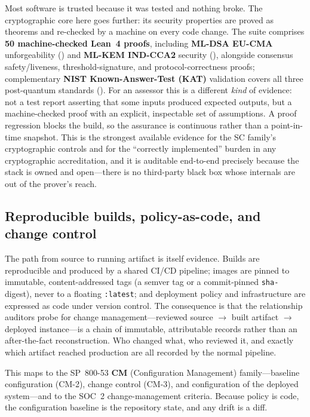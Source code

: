 \documentclass[11pt,letterpaper]{article}
\begin{document}
Most software is trusted because it was tested and nothing broke. The cryptographic
core here goes further: its security properties are proved as theorems and re-checked
by a machine on every code change. The suite comprises \textbf{50 machine-checked
Lean~4 proofs}, including \textbf{ML-DSA EU-CMA} unforgeability () and
\textbf{ML-KEM IND-CCA2} security (), alongside consensus safety/liveness,
threshold-signature, and protocol-correctness proofs; complementary
\textbf{NIST Known-Answer-Test (KAT)} validation covers all three post-quantum
standards (). For an assessor this is a different \emph{kind} of
evidence: not a test report asserting that some inputs produced expected outputs, but
a machine-checked proof with an explicit, inspectable set of assumptions. A proof
regression blocks the build, so the assurance is continuous rather than a point-in-time
snapshot. This is the strongest available evidence for the SC family's cryptographic
controls and for the ``correctly implemented'' burden in any cryptographic
accreditation, and it is auditable end-to-end precisely because the stack is owned and
open---there is no third-party black box whose internals are out of the prover's reach.

\subsection{Reproducible builds, policy-as-code, and change control}

The path from source to running artifact is itself evidence. Builds are reproducible
and produced by a shared CI/CD pipeline; images are pinned to immutable,
content-addressed tags (a semver tag or a commit-pinned \texttt{sha-} digest), never
to a floating \texttt{:latest}; and deployment policy and infrastructure are
expressed as code under version control. The consequence is that the relationship
auditors probe for change management---reviewed source $\rightarrow$ built artifact
$\rightarrow$ deployed instance---is a chain of immutable, attributable records rather
than an after-the-fact reconstruction. Who changed what, who reviewed it, and exactly
which artifact reached production are all recorded by the normal pipeline.

This maps to the SP~800-53 \textbf{CM} (Configuration Management) family---baseline
configuration (CM-2), change control (CM-3), and configuration of the deployed
system---and to the SOC~2 change-management criteria. Because policy is code, the
configuration baseline is the repository state, and any drift is a diff.
\end{document}
